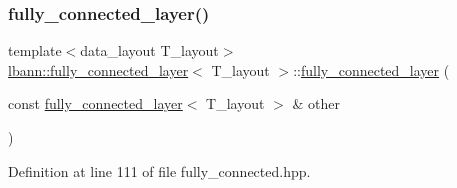 \subsubsection{\texorpdfstring{fully\+\_\+connected\+\_\+layer()}{fully\_connected\_layer()}\hspace{0.1cm}{\footnotesize\ttfamily [2/2]}}
{\footnotesize\ttfamily template$<$data\+\_\+layout T\+\_\+layout$>$ \\
\hyperlink{classlbann_1_1fully__connected__layer}{lbann\+::fully\+\_\+connected\+\_\+layer}$<$ T\+\_\+layout $>$\+::\hyperlink{classlbann_1_1fully__connected__layer}{fully\+\_\+connected\+\_\+layer} (\begin{DoxyParamCaption}\item[{const \hyperlink{classlbann_1_1fully__connected__layer}{fully\+\_\+connected\+\_\+layer}$<$ T\+\_\+layout $>$ \&}]{other }\end{DoxyParamCaption})\hspace{0.3cm}{\ttfamily [inline]}}



Definition at line 111 of file fully\+\_\+connected.\+hpp.


